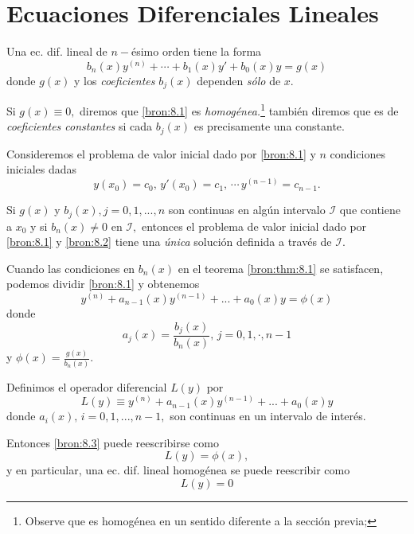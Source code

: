 \section{Ecuaciones Diferenciales Lineales}


	Una ec. dif. lineal de $n-$\'esimo orden tiene la forma
	\[
		\label{bron:8.1}
		b_{n}(x)y^{(n)}+\cdots+b_{1}(x)y'+b_{0}(x)y=g(x)
	\]
	donde $g(x)$ y los \emph{coeficientes} $b_{j}(x)$ dependen \emph{s\'olo} de $x.$



	Si $g(x)\equiv 0,$ diremos que \eqref{bron:8.1} es \emph{homog\'enea.}\footnote{Observe que es homog\'enea en un sentido diferente a la secci\'on previa;} tambi\'en diremos que es de \emph{coeficientes constantes} si cada $b_{j}(x)$ es precisamente una constante.
	



	\begin{teorema}
		\label{bron:thm:8.1}
		Consideremos el problema de valor inicial dado por \eqref{bron:8.1} y $n$ condiciones iniciales dadas
		\[
			\label{bron:8.2}
			y(x_{0})=c_{0}, \, y'(x_{0})=c_{1}, \, \cdots \, y^{(n-1)}=c_{n-1}.
		\]
		
		Si $g(x)$ y $b_{j}(x), j=0,1,...,n$ son continuas en algún intervalo $\mathcal{I}$ que contiene a $x_{0}$ y si $b_{n}(x)\neq 0$ en $\mathcal{I},$ entonces el problema de valor inicial dado por \eqref{bron:8.1} y \eqref{bron:8.2} tiene una \emph{única} soluci\'on definida a trav\'es de $\mathcal{I}.$
	\end{teorema}
	



	Cuando las condiciones en $b_{n}(x)$ en el teorema \ref{bron:thm:8.1} se satisfacen, podemos dividir \eqref{bron:8.1} y obtenemos
	\[
		\label{bron:8.3}
		y^{(n)}+a_{n-1}(x)y^{(n-1)}+...+a_{0}(x)y=\phi(x)
	\]
	donde $$a_{j}(x)=\dfrac{b_{j}(x)}{b_{n}(x)}, \, j=0,1,\cdot, n-1$$ y
	$\phi(x)=\frac{g(x)}{b_{n}(x)}.$
	



	Definimos el operador diferencial $L(y)$ por
	\[
		\label{bron:8.4}
		L(y)\equiv y^{(n)}+a_{n-1}(x)y^{(n-1)}+...+a_{0}(x)y
	\]
	donde $a_{i}(x), \, i=0,1,...,n-1,$ son continuas en un intervalo de inter\'es.
	



	Entonces \eqref{bron:8.3} puede reescribirse como
	\[
		\label{bron:8.5}
		L(y)=\phi(x),
	\]
	y en particular, una ec. dif. lineal homog\'enea se puede reescribir como
	\[
		\label{bron:8.6}
		L(y)=0
	\]
	


